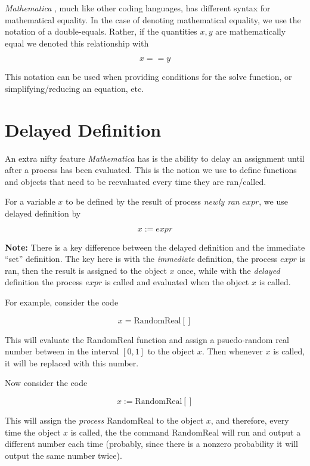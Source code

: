 \documentclass[11pt,letterpaper,twoside,titlepage]{book}
\newcommand{\Mathematica}{\textit{Mathematica} }
\begin{document}
				\Mathematica, much like other coding languages, has different syntax for mathematical equality.  In the case of denoting mathematical equality, we use the notation of a double-equals.  Rather, if the quantities $x,y$ are mathematically equal we denoted this relationship with 
				
				\[ x == y \]
				
				This notation can be used when providing conditions for the solve function, or simplifying/reducing an equation, etc.
			
			\section{Delayed Definition}
			
				An extra nifty feature \Mathematica has is the ability to delay an assignment until after a process has been evaluated.  This is the notion we use to define functions and objects that need to be reevaluated every time they are ran/called.
				
				For a variable $x$ to be defined by the result of process \emph{newly ran} $expr$, we use delayed definition by
				
				\[ x := expr \]
				
				\textbf{Note:}  There is a key difference between the delayed definition and the immediate ``set'' definition.  The key here is with the \emph{immediate} definition, the process $expr$ is ran, then the result is assigned to the object $x$ once, while with the \emph{delayed} definition the process $expr$ is called and evaluated when the object $x$ is called.
				
				For example, consider the code 
				
				\[ x = \mathrm{RandomReal}[] \]
				
				This will evaluate the RandomReal function and assign a psuedo-random real number between in the interval $[0,1]$ to the object $x$.  Then whenever $x$ is called, it will be replaced with this number.
				
				Now consider the code
				
				\[ x := \mathrm{RandomReal}[] \]
				
				This will assign the \emph{process} RandomReal to the object $x$, and therefore, every time the object $x$ is called, the the command RandomReal will run and output a different number each time (probably, since there is a nonzero probability it will output the same number twice).
				
\end{document}
